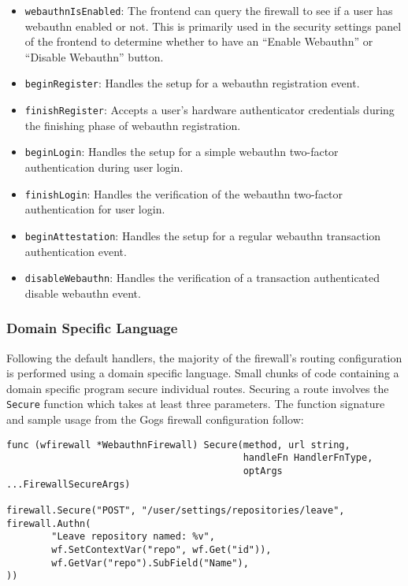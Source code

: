 \begin{itemize}[nosep]
\item \lstinline{webauthnIsEnabled}: The frontend can query the firewall to see if a user has webauthn enabled or not. This is primarily used in the security settings panel of the frontend to determine whether to  have an ``Enable Webauthn'' or ``Disable Webauthn'' button.

\item \lstinline{beginRegister}: Handles the setup for a webauthn registration event.

\item \lstinline{finishRegister}: Accepts a user's hardware authenticator credentials during the finishing phase of webauthn registration.

\item \lstinline{beginLogin}: Handles the setup for a simple webauthn two-factor authentication during user login.

\item \lstinline{finishLogin}: Handles the verification of the webauthn two-factor authentication for user login.

\item \lstinline{beginAttestation}: Handles the setup for a regular webauthn transaction authentication event.

\item \lstinline{disableWebauthn}: Handles the verification of a transaction authenticated disable webauthn event.

\end{itemize}

\subsubsection{Domain Specific Language}

Following the default handlers, the majority of the firewall's routing configuration is performed using a domain specific language. Small chunks of code containing a domain specific program secure individual routes. Securing a route involves the \lstinline{Secure} function which takes at least three parameters. The function signature and sample usage from the Gogs firewall configuration follow:

\begin{lstlisting}
func (wfirewall *WebauthnFirewall) Secure(method, url string, 
                                          handleFn HandlerFnType, 
                                          optArgs ...FirewallSecureArgs)

firewall.Secure("POST", "/user/settings/repositories/leave", firewall.Authn(
        "Leave repository named: %v",
        wf.SetContextVar("repo", wf.Get("id")),
        wf.GetVar("repo").SubField("Name"),
))
\end{lstlisting}

